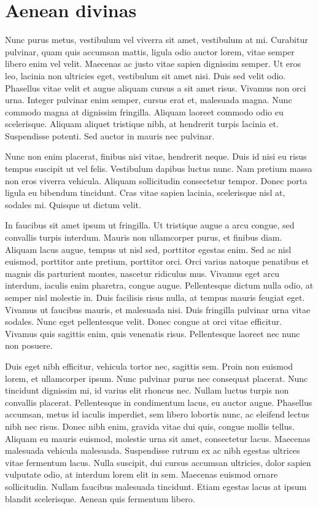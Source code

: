 \section{Aenean divinas}

Nunc purus metus, vestibulum vel viverra sit amet, vestibulum at mi. Curabitur pulvinar, quam quis accumsan mattis, ligula odio auctor lorem, vitae semper libero enim vel velit. Maecenas ac justo vitae sapien dignissim semper. Ut eros leo, lacinia non ultricies eget, vestibulum sit amet nisi. Duis sed velit odio. Phasellus vitae velit et augue aliquam cursus a sit amet risus. Vivamus non orci urna. Integer pulvinar enim semper, cursus erat et, malesuada magna. Nunc commodo magna at dignissim fringilla. Aliquam laoreet commodo odio eu scelerisque. Aliquam aliquet tristique nibh, at hendrerit turpis lacinia et. Suspendisse potenti. Sed auctor in mauris nec pulvinar.

Nunc non enim placerat, finibus nisi vitae, hendrerit neque. Duis id nisi eu risus tempus suscipit ut vel felis. Vestibulum dapibus luctus nunc. Nam pretium massa non eros viverra vehicula. Aliquam sollicitudin consectetur tempor. Donec porta ligula eu bibendum tincidunt. Cras vitae sapien lacinia, scelerisque nisl at, sodales mi. Quisque ut dictum velit.

In faucibus sit amet ipsum ut fringilla. Ut tristique augue a arcu congue, sed convallis turpis interdum. Mauris non ullamcorper purus, et finibus diam. Aliquam lacus augue, tempus ut nisl sed, porttitor egestas enim. Sed ac nisl euismod, porttitor ante pretium, porttitor orci. Orci varius natoque penatibus et magnis dis parturient montes, nascetur ridiculus mus. Vivamus eget arcu interdum, iaculis enim pharetra, congue augue. Pellentesque dictum nulla odio, at semper nisl molestie in. Duis facilisis risus nulla, at tempus mauris feugiat eget. Vivamus ut faucibus mauris, et malesuada nisi. Duis fringilla pulvinar urna vitae sodales. Nunc eget pellentesque velit. Donec congue at orci vitae efficitur. Vivamus quis sagittis enim, quis venenatis risus. Pellentesque laoreet nec nunc non posuere.

Duis eget nibh efficitur, vehicula tortor nec, sagittis sem. Proin non euismod lorem, et ullamcorper ipsum. Nunc pulvinar purus nec consequat placerat. Nunc tincidunt dignissim mi, id varius elit rhoncus nec. Nullam luctus turpis non convallis placerat. Pellentesque in condimentum lacus, eu auctor augue. Phasellus accumsan, metus id iaculis imperdiet, sem libero lobortis nunc, ac eleifend lectus nibh nec risus. Donec nibh enim, gravida vitae dui quis, congue mollis tellus. Aliquam eu mauris euismod, molestie urna sit amet, consectetur lacus. Maecenas malesuada vehicula malesuada. Suspendisse rutrum ex ac nibh egestas ultrices vitae fermentum lacus. Nulla suscipit, dui cursus accumsan ultricies, dolor sapien vulputate odio, at interdum lorem elit in sem. Maecenas euismod ornare sollicitudin. Nullam faucibus malesuada tincidunt. Etiam egestas lacus at ipsum blandit scelerisque. Aenean quis fermentum libero.

